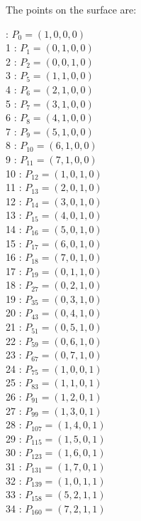 \documentclass{article}
\begin{document}
{The points on the surface are:\\
\begin{multicols}{3}
 : $P_{0}=( 1, 0, 0, 0 )$\\
1 : $P_{1}=( 0, 1, 0, 0 )$\\
2 : $P_{2}=( 0, 0, 1, 0 )$\\
3 : $P_{5}=( 1, 1, 0, 0 )$\\
4 : $P_{6}=( 2, 1, 0, 0 )$\\
5 : $P_{7}=( 3, 1, 0, 0 )$\\
6 : $P_{8}=( 4, 1, 0, 0 )$\\
7 : $P_{9}=( 5, 1, 0, 0 )$\\
8 : $P_{10}=( 6, 1, 0, 0 )$\\
9 : $P_{11}=( 7, 1, 0, 0 )$\\
10 : $P_{12}=( 1, 0, 1, 0 )$\\
11 : $P_{13}=( 2, 0, 1, 0 )$\\
12 : $P_{14}=( 3, 0, 1, 0 )$\\
13 : $P_{15}=( 4, 0, 1, 0 )$\\
14 : $P_{16}=( 5, 0, 1, 0 )$\\
15 : $P_{17}=( 6, 0, 1, 0 )$\\
16 : $P_{18}=( 7, 0, 1, 0 )$\\
17 : $P_{19}=( 0, 1, 1, 0 )$\\
18 : $P_{27}=( 0, 2, 1, 0 )$\\
19 : $P_{35}=( 0, 3, 1, 0 )$\\
20 : $P_{43}=( 0, 4, 1, 0 )$\\
21 : $P_{51}=( 0, 5, 1, 0 )$\\
22 : $P_{59}=( 0, 6, 1, 0 )$\\
23 : $P_{67}=( 0, 7, 1, 0 )$\\
24 : $P_{75}=( 1, 0, 0, 1 )$\\
25 : $P_{83}=( 1, 1, 0, 1 )$\\
26 : $P_{91}=( 1, 2, 0, 1 )$\\
27 : $P_{99}=( 1, 3, 0, 1 )$\\
28 : $P_{107}=( 1, 4, 0, 1 )$\\
29 : $P_{115}=( 1, 5, 0, 1 )$\\
30 : $P_{123}=( 1, 6, 0, 1 )$\\
31 : $P_{131}=( 1, 7, 0, 1 )$\\
32 : $P_{139}=( 1, 0, 1, 1 )$\\
33 : $P_{158}=( 5, 2, 1, 1 )$\\
34 : $P_{160}=( 7, 2, 1, 1 )$\\

\end{multicols}}
\end{document}
